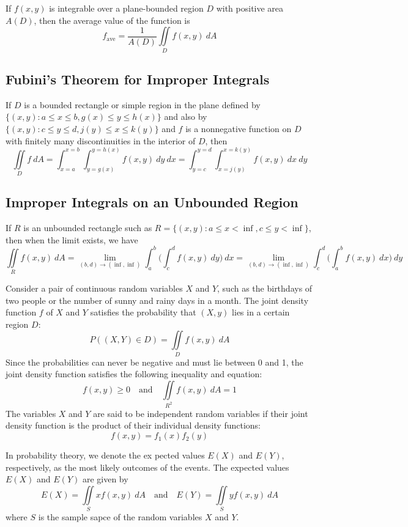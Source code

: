 \documentclass{article}
\begin{document}
If $f(x,y)$ is integrable over a plane-bounded region $D$ with positive area $A(D)$, then the average value of the function is
\[f_\text{ave}=\frac{1}{A(D)}\iint\limits_D f(x,y)\: dA\]

\subsection*{Fubini's Theorem for Improper Integrals}

If $D$ is a bounded rectangle or simple region in the plane defined by $\{(x,y): a\leq x\leq b, g(x)\leq y\leq h(x)\}$ and also by $\{(x,y): c\leq y\leq d, j(y)\leq x\leq k(y)\}$ and $f$ is a nonnegative function on $D$ with finitely many discontinuities in the interior of $D$, then
\[\iint\limits_D f\: dA=\int_{x=a}^{x=b}\int_{y=g(x)}^{y=h(x)} f(x,y)\: dy\: dx=\int_{y=c}^{y=d}\int_{x=j(y)}^{x=k(y)} f(x,y)\: dx\: dy\]

\subsection*{Improper Integrals on an Unbounded Region}

If $R$ is an unbounded rectangle such as $R=\{(x,y): a\leq x < \inf, c\leq y < \inf\}$, then when the limit exists, we have
\[\iint\limits_R f(x,y)\: dA=\lim_{(b,d)\rightarrow(\inf,\inf)}\int_a^b\Bigg(\int_c^d f(x,y)\: dy\Bigg)\: dx=\lim_{(b,d)\rightarrow(\inf,\inf)}\int_c^d\Bigg(\int_a^b f(x,y)\: dx\Bigg)\: dy\]

Consider a pair of continuous random variables $X$ and $Y$, such as the birthdays of two people or the number of sunny and rainy days in a month. The joint density function $f$ of $X$ and $Y$ satisfies the probability that $(X,y)$ lies in a certain region $D$:
\[P((X,Y)\in D)=\iint\limits_D f(x,y)\: dA\]
Since the probabilities can never be negative and must lie between 0 and 1, the joint density function satisfies the following inequality and equation:
\[f(x,y)\geq 0\quad\text{and}\quad\iint\limits_{R^2}f(x,y)\: dA=1\]
The variables $X$ and $Y$ are said to be independent random variables if their joint density function is the product of their individual density functions:
\[f(x,y)=f_1(x)f_2(y)\]

In probability theory, we denote the ex pected values $E(X)$ and $E(Y)$, respectively, as the most likely outcomes of the events. The expected values $E(X)$ and $E(Y)$ are given by
\[E(X)=\iint\limits_S xf(x,y)\: dA\quad\text{and}\quad E(Y)=\iint\limits_S yf(x,y)\: dA\]
where $S$ is the sample sapce of the random variables $X$ and $Y$.
\end{document}
